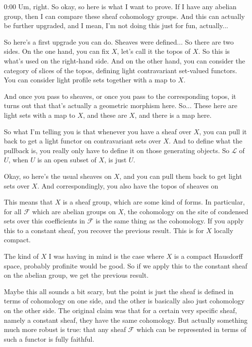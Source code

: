 \begin{unfinished}{0:00}
Um, right. So okay, so here is what I want to prove. If I have any abelian group, then I can compare these sheaf cohomology groups. And this can actually be further upgraded, and I mean, I'm not doing this just for fun, actually...

So here's a first upgrade you can do. Sheaves were defined... So there are two sides. On the one hand, you can fix $X$, let's call it the topos of $X$. So this is what's used on the right-hand side. And on the other hand, you can consider the category of slices of the topos, defining light contravariant set-valued functors. You can consider light profile sets together with a map to $X$.

And once you pass to sheaves, or once you pass to the corresponding topos, it turns out that that's actually a geometric morphism here. So... These here are light sets with a map to $X$, and these are $X$, and there is a map here.

So what I'm telling you is that whenever you have a sheaf over $X$, you can pull it back to get a light functor on contravariant sets over $X$. And to define what the pullback is, you really only have to define it on those generating objects. So $\mathcal{L}$ of $U$, when $U$ is an open subset of $X$, is just $U$.

Okay, so here's the usual sheaves on $X$, and you can pull them back to get light sets over $X$. And correspondingly, you also have the topos of sheaves on 

This means that $X$ is a sheaf group, which are some kind of forms. In particular, for all $\mathcal{F}$ which are abelian groups on $X$, the cohomology on the site of condensed sets over this coefficients in $\mathcal{F}$ is the same thing as the cohomology. If you apply this to a constant sheaf, you recover the previous result. This is for $X$ locally compact.

The kind of $X$ I was having in mind is the case where $X$ is a compact Hausdorff space, probably profinite would be good. So if we apply this to the constant sheaf on the abelian group, we get the previous result.

Maybe this all sounds a bit scary, but the point is just the sheaf is defined in terms of cohomology on one side, and the other is basically also just cohomology on the other side. The original claim was that for a certain very specific sheaf, namely a constant sheaf, they have the same cohomology. But actually something much more robust is true: that any sheaf $\mathcal{F}$ which can be represented in terms of such a functor is fully faithful.


\end{unfinished}
